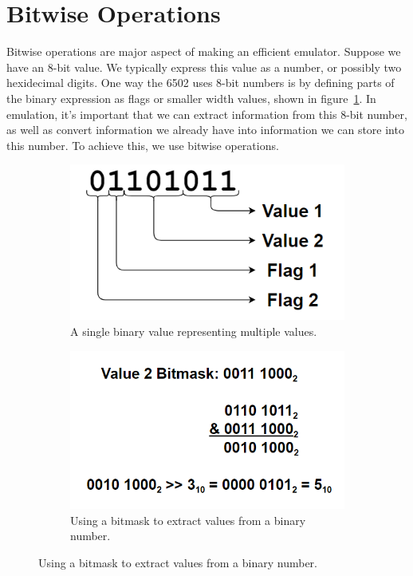 \documentclass[12pt]{article}
\begin{document}
\section{Bitwise Operations}
\label{sec:bitwise}

Bitwise operations are major aspect of making an efficient emulator. Suppose we have an 8-bit value.
We typically express this value as a number, or possibly two hexidecimal digits. One way the 6502 uses
8-bit numbers is by defining parts of the binary expression as flags or smaller width values, shown in figure~\ref{fig:figure1}.
In emulation, it's important that we can extract information from this 8-bit number, as well as convert
information we already have into information we can store into this number. To achieve this, we use
bitwise operations.

\begin{figure}[b!]
	\centering
	\begin{subfigure}[t]{0.5\linewidth}
		\includegraphics[bb=0 0 462 262]{figure1.PNG}
		\caption{A single binary value representing multiple values.}
		\label{fig:figure1}
	\end{subfigure}
	\begin{subfigure}[t]{0.4\linewidth}
		\includegraphics[bb=0 0 554 320]{figure2.PNG}
		\caption{Using a bitmask to extract values from a binary number.}
		\label{fig:figure2}
	\end{subfigure}
\end{figure}
\end{document}
